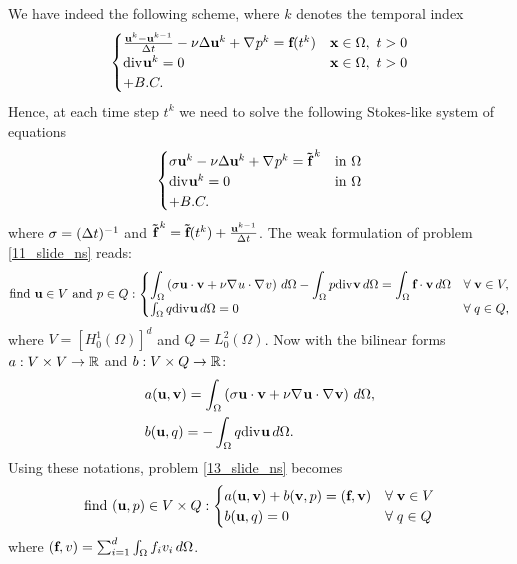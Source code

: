 We have indeed the following scheme, where \(k\) denotes the temporal index 
\begin{equation*}
    \begin{cases}
        \frac{\textbf{u}^k - \textbf{u}^{k-1}}{\Delta t} - \nu \Delta \textbf{u}^k + \nabla\mspace{1mu} p^k = \textbf{f}(t^k) & \textbf{x} \in \Omega, \ t > 0 \\
        \text{div}\mspace{1mu} \textbf{u}^k = 0 & \textbf{x} \in \Omega, \ t > 0 \\
        + B.C.
    \end{cases}
\end{equation*}
Hence, at each time step \(t^k\) we need to solve the following Stokes-like system of equations 
\begin{equation}
    \begin{cases}
        \sigma \textbf{u}^k - \nu \Delta \textbf{u}^k + \nabla\mspace{1mu} p^k = \bm{\tilde{\textbf{f}}}^{\,k} & \text{in } \Omega \\
        \text{div}\mspace{1mu} \textbf{u}^k = 0 & \text{in }\Omega \\
        + B.C.
    \end{cases}
    \label{12_slide_ns}
\end{equation}
where \(\sigma = (\Delta t)^{-1}\) and \(\bm{\tilde{\textbf{f}}}^{\,k} = \bm{\tilde{\textbf{f}}}(t^k) + \frac{\textbf{u}^{k-1}}{\Delta t}\).
The weak formulation of problem \eqref{11_slide_ns} reads: 
\begin{equation}
    \text{find } \textbf{u} \in V \text{ and } p \in Q : 
    \begin{cases}
        \displaystyle \int_\Omega \left( \sigma \textbf{u} \cdot \textbf{v} + \nu \nabla\mspace{1mu} u \cdot \nabla\mspace{1mu} v \right) \, d\Omega - \int_\Omega p \text{div}\mspace{1mu} \textbf{v} \, d\Omega = \int_\Omega \textbf{f} \cdot \textbf{v} \, d\Omega & \forall \; \textbf{v} \in V, \\
        \int_\Omega q \text{div}\mspace{1mu} \textbf{u} \, d\Omega = 0 & \forall \; q \in Q,
    \end{cases}
    \label{13_slide_ns}
\end{equation} 
where \(V = \left[ H^1_0(\Omega) \right]^d\) and \(Q = L^2_0(\Omega)\). Now with the bilinear forms \(a : V \times V \to \mathbb{R}\) and \(b:V\times Q \to \mathbb{R}\):
\begin{equation}
    \begin{aligned}
        &a(\textbf{u}, \textbf{v}) = \int_\Omega \left( \sigma \textbf{u} \cdot \textbf{v} + \nu \nabla\mspace{1mu} \textbf{u} \cdot \nabla\mspace{1mu} \textbf{v} \right) \, d\Omega, \\
        &b(\textbf{u}, q) = -\int_\Omega q\text{div}\mspace{1mu}\textbf{u} \, d\Omega.
    \end{aligned}
    \label{14_slide_ns}
\end{equation}
Using these notations, problem \eqref{13_slide_ns} becomes
\begin{equation}
    \text{find }(\textbf{u},p) \in V \times Q:
    \begin{cases}
        a(\textbf{u},\textbf{v}) + b(\textbf{v}, p) =  (\textbf{f}, \textbf{v}) & \forall \; \textbf{v} \in V \\
        b(\textbf{u}, q) = 0 &\forall \; q \in Q
    \end{cases}
    \label{15_slide_ns}
\end{equation}
where \((\textbf{f}, v) = \sum_{i=1}^{d} \int_\Omega f_iv_i \, d\Omega\).

